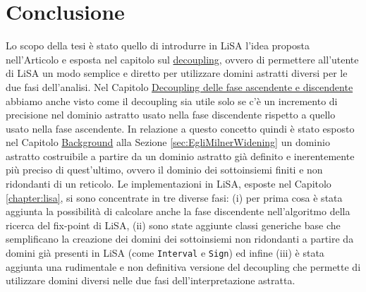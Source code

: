 \chapter{Conclusione} %
Lo scopo della tesi è stato quello di introdurre in LiSA l'idea proposta nell'Articolo \cite{DBLP:conf/aplas/ArceriMZ22} e esposta nel capitolo sul \hyperref[chapter:decoupling]{decoupling}, ovvero di permettere all'utente di LiSA un modo semplice e diretto per utilizzare domini astratti diversi per le due fasi dell'analisi. Nel Capitolo \hyperref[chapter:decoupling]{Decoupling delle fase ascendente e discendente} abbiamo anche visto come il decoupling sia utile solo se c'è un incremento di precisione nel dominio  astratto usato nella fase discendente rispetto a quello usato nella fase ascendente. In relazione a questo concetto quindi è stato esposto nel Capitolo \hyperref[chapter:background]{Background} alla Sezione \ref{sec:EgliMilnerWidening} un dominio astratto costruibile a partire da un dominio astratto già definito e inerentemente più preciso di quest'ultimo, ovvero il dominio dei sottoinsiemi finiti e non ridondanti di un reticolo. Le implementazioni in LiSA, esposte nel Capitolo \ref{chapter:lisa}, si sono concentrate in tre diverse fasi: (i) per prima cosa è stata aggiunta la possibilità di calcolare anche la fase discendente nell'algoritmo della ricerca del fix-point di LiSA, (ii) sono state aggiunte classi generiche base che semplificano la creazione dei domini dei sottoinsiemi non ridondanti a partire da domini già presenti in LiSA (come \texttt{Interval} e \texttt{Sign}) ed infine (iii) è stata aggiunta una rudimentale e non definitiva versione del decoupling che permette di utilizzare domini diversi nelle due fasi dell'interpretazione astratta.

